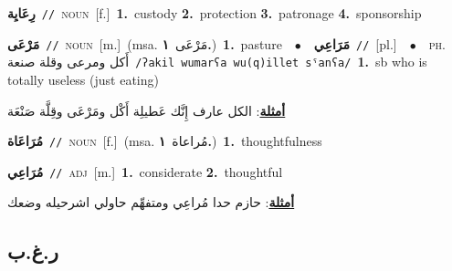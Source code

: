 \documentclass[10pt,a4paper,twoside]{article} %
\begin{document}
\begin{multicols}{2}
{\setlength\topsep{0pt}\textbf{\foreignlanguage{arabic}{رِعَايِة}}\ {\color{gray}\texttt{//}\color{black}}\ \textsc{noun}\ [f.]\ \textbf{1.}~custody  \textbf{2.}~protection  \textbf{3.}~patronage  \textbf{4.}~sponsorship\ } \vspace{2mm}

{\setlength\topsep{0pt}\textbf{\foreignlanguage{arabic}{مَرْعَى}}\ {\color{gray}\texttt{//}\color{black}}\ \textsc{noun}\ [m.]\ \color{gray}(msa. \foreignlanguage{arabic}{مَرْعَى}~\foreignlanguage{arabic}{\textbf{١.}})\color{black}\ \textbf{1.}~pasture\ \ $\bullet$\ \ \setlength\topsep{0pt}\textbf{\foreignlanguage{arabic}{مَرَاعِي}}\ {\color{gray}\texttt{//}\color{black}}\ [pl.]\ \ $\bullet$\ \ \textsc{ph.} \color{gray} \foreignlanguage{arabic}{أَكل ومرعى وقلة صنعة}\color{black}\ {\color{gray}\texttt{/{\sffamily ʔakil wumarʕa wu(q)illet sˤanʕa}/}\color{black}}\ \textbf{1.}~sb who is totally useless (just eating)\  \begin{flushright}\color{gray}\foreignlanguage{arabic}{\textbf{\underline{\foreignlanguage{arabic}{أمثلة}}}: الكل عارف إِنَّك عَطيلِة أَكْل ومَرْعَى وقِلَّة صَنْعَة}\end{flushright}\color{black}} \vspace{2mm}

{\setlength\topsep{0pt}\textbf{\foreignlanguage{arabic}{مُرَاعَاة}}\ {\color{gray}\texttt{//}\color{black}}\ \textsc{noun}\ [f.]\ \color{gray}(msa. \foreignlanguage{arabic}{مُراعاة}~\foreignlanguage{arabic}{\textbf{١.}})\color{black}\ \textbf{1.}~thoughtfulness\ } \vspace{2mm}

{\setlength\topsep{0pt}\textbf{\foreignlanguage{arabic}{مُرَاعِي}}\ {\color{gray}\texttt{//}\color{black}}\ \textsc{adj}\ [m.]\ \textbf{1.}~considerate  \textbf{2.}~thoughtful\  \begin{flushright}\color{gray}\foreignlanguage{arabic}{\textbf{\underline{\foreignlanguage{arabic}{أمثلة}}}: حازم حدا مُراعِي ومتفهِّم حاولي اشرحيله وضعك}\end{flushright}\color{black}} \vspace{2mm}

\vspace{-3mm}
\subsection*{\color{blue}\foreignlanguage{arabic}{ر.غ.ب}\color{blue}{}} 


\end{multicols}
\end{document}
